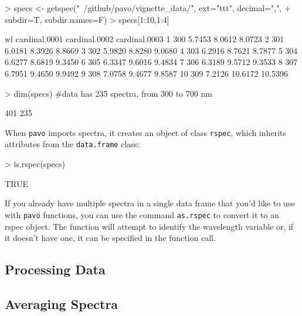 \documentclass{article}
\newcommand{\pavo}{{\tt pavo}}  %
\newcommand{\code}[1]{{\tt #1}}  %
\begin{document}
\begin{Schunk}
\begin{Sinput}
> specs <- getspec("~/github/pavo/vignette_data/", ext="ttt", decimal=",", 
+                  subdir=T, subdir.names=F)
> specs[1:10,1:4]
\end{Sinput}
\begin{Soutput}
    wl cardinal.0001 cardinal.0002 cardinal.0003
1  300        5.7453        8.0612        8.0723
2  301        6.0181        8.3926        8.8669
3  302        5.9820        8.8280        9.0680
4  303        6.2916        8.7621        8.7877
5  304        6.6277        8.6819        9.3450
6  305        6.3347        9.6016        9.4834
7  306        6.3189        9.5712        9.3533
8  307        6.7951        9.4650        9.9492
9  308        7.0758        9.4677        9.8587
10 309        7.2126       10.6172       10.5396
\end{Soutput}
\begin{Sinput}
> dim(specs) #data has 235 spectra, from 300 to 700 nm
\end{Sinput}
\begin{Soutput}
[1] 401 235
\end{Soutput}
\end{Schunk}

When \pavo{} imports spectra, it creates an object of class \code{rspec}, which inherits attributes from the \code{data.frame} class:
\begin{Schunk}
\begin{Sinput}
> is.rspec(specs)
\end{Sinput}
\begin{Soutput}
[1] TRUE
\end{Soutput}
\end{Schunk}

If you already have multiple spectra in a single data frame that you'd like to use with \pavo{} 
functions, you can use the command \code{as.rspec} to convert it to an rspec object. The 
function will attempt to identify the wavelength variable or, if it doesn't have one, it can be 
specified in the function call.

\subsection{Processing Data}

\subsection{Averaging Spectra}
\end{document}
